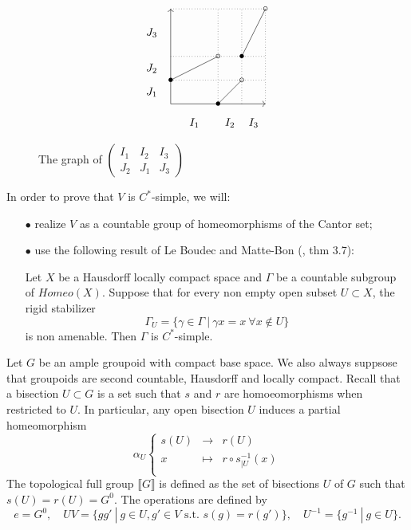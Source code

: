 \begin{figure}
\centering
\[\begin{tikzpicture}[scale=3] 

\draw[->] (0,0) -- (0,1);
\draw[->] (0,0) -- (1,0);
\draw[dotted] (1,0) -- (1,1);
\draw[dotted] (0,1) -- (1,1);

\draw (0,0.25) -- (0.5,0.5);
\draw (0.5, 0) -- (0.75,0.25);
\draw (0.75,0.5) -- (1,1);

\draw[dotted] (0.5,0) -- (0.5,1);
\draw[dotted] (0.75,0) -- (0.75,1);
\draw[dotted] (0,0.25) -- (1,0.25);
\draw[dotted] (0,0.5) -- (1,0.5);

\draw (0,0.25) node {$\bullet$}; \draw (0.5,0.5) node {$\circ$};
\draw (0.5,0)  node {$\bullet$}; \draw (0.75,0.25) node {$\circ$};
\draw (0.75,0.5) node {$\bullet$}; \draw (1,1) node {$\circ$};

\draw (0.25,-0.2) node {$I_1$};
\draw (0.625,-0.2) node {$I_2$};
\draw (0.875,-0.2) node {$I_3$};
\draw (-0.2,0.125) node {$J_1$};
\draw (-0.2,0.375) node {$J_2$};
\draw (-0.2, 0.75) node {$J_3$};
\end{tikzpicture} \] 
\caption{The graph of $\begin{pmatrix} I_1 & I_2 & I_3 \\ J_2 & J_1 & J_3\end{pmatrix}$}
\end{figure}

In order to prove that $V$ is $C^*$-simple, we will:
\begin{itemize}
\item[$\bullet$] realize $V$ as a countable group of homeomorphisms of the Cantor set;
\item[$\bullet$] use the following result of Le Boudec and Matte-Bon (\cite{Boudec2016subgroup}, thm 3.7):
\begin{thm}
Let $X$ be a Hausdorff locally compact space and $\Gamma$ be a countable subgroup of $Homeo(X)$. Suppose that for every non empty open subset $U\subset X$, the rigid stabilizer
\[\Gamma_U = \{\gamma \in \Gamma \ |\  \gamma x = x \ \forall x\notin U\}\]
is non amenable. Then $\Gamma$ is $C^*$-simple.
\end{thm}
\end{itemize}

Let $G$ be an ample groupoid with compact base space. We also always suppsose that groupoids are second countable, Hausdorff and locally compact. Recall that a bisection $U\subset G$ is a set such that $s$ and $r$ are homoeomorphisms when restricted to $U$. In particular, any open bisection $U$ induces a partial homeomorphism
\[\alpha_U \left\{ \begin{array}{rcl}
s(U) & \rightarrow & r(U)\\ x & \mapsto & r\circ s_{|U}^{-1}(x)\\
 \end{array}\right.\] 
The topological full group $\llbracket  G \rrbracket$ is defined as the set of bisections $U$ of $G$ such that $s(U)=r(U)= G^0$. The operations are defined by 
\[e = G^0, \quad UV = \{gg' \ | \ g\in U , g'\in V  \text{ s.t. } s(g)=r(g')\}, \quad U^{-1}= \{g^{-1} \ | \ g\in U\}.\]

